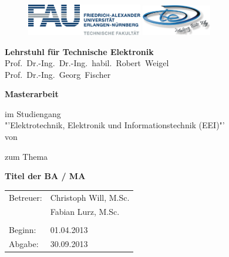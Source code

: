 \begin{titlepage}
\begin{figure}
\includegraphics[width=0.45\textwidth]{Abbildungen/Logo/FAUlogo}\hfill
\includegraphics[width=0.27\textwidth]{Abbildungen/Logo/LTElogo}
\end{figure}
\hspace{0.1cm}	
\center
\LARGE
	\textbf{Lehrstuhl für Technische Elektronik} \\
	Prof.~Dr.-Ing.~Dr.-Ing.~habil.~Robert~Weigel	\\
	Prof.~Dr.-Ing.~Georg~Fischer\\
\vspace{1cm}	

\LARGE
	\textbf{Masterarbeit}
\vspace{0.9cm}

\large
im Studiengang\\ "'Elektrotechnik, Elektronik und Informationstechnik (EEI)"'\\
\vspace{0.5cm}
von
\vspace{0.5cm}

\LARGE{
\authorname}
\vspace{0.7cm}

\large
zum Thema
\vspace{0.9cm}

\LARGE
\textbf{Titel der BA / MA}
\vspace{1.7cm}

\large
\begin{tabular}{ll}
Betreuer: & Christoph Will, M.Sc. \\ & Fabian Lurz, M.Sc.\\
 &\\
Beginn: & 01.04.2013\\
Abgabe: & 30.09.2013\\
\end{tabular}
\end{titlepage}
